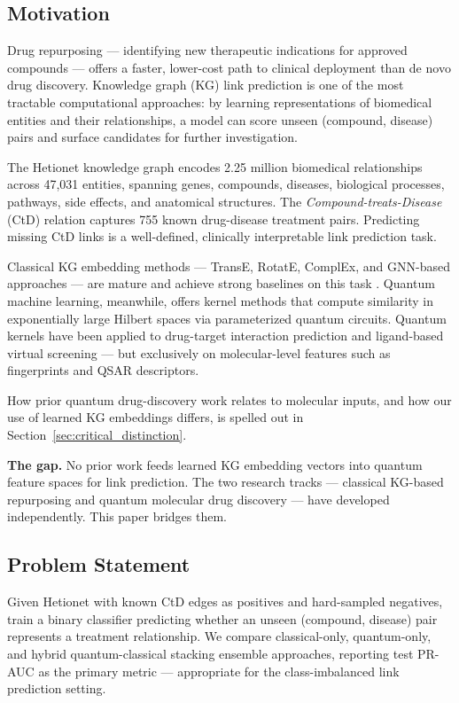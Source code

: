 \documentclass[10pt,twocolumn]{article}
\begin{document}
\subsection{Motivation}

Drug repurposing --- identifying new therapeutic indications for approved compounds --- offers a faster, lower-cost path to clinical deployment than de novo drug discovery. Knowledge graph (KG) link prediction is one of the most tractable computational approaches: by learning representations of biomedical entities and their relationships, a model can score unseen (compound, disease) pairs and surface candidates for further investigation.

The Hetionet knowledge graph \cite{himmelstein2017} encodes 2.25 million biomedical relationships across 47,031 entities, spanning genes, compounds, diseases, biological processes, pathways, side effects, and anatomical structures. The \textit{Compound-treats-Disease} (CtD) relation captures 755 known drug-disease treatment pairs. Predicting missing CtD links is a well-defined, clinically interpretable link prediction task.

Classical KG embedding methods --- TransE, RotatE, ComplEx, and GNN-based approaches --- are mature and achieve strong baselines on this task \cite{mayers2023}. Quantum machine learning, meanwhile, offers kernel methods that compute similarity in exponentially large Hilbert spaces via parameterized quantum circuits. Quantum kernels have been applied to drug-target interaction prediction \cite{qkdti2025} and ligand-based virtual screening \cite{kruger2023} --- but exclusively on molecular-level features such as fingerprints and QSAR descriptors.

How prior quantum drug-discovery work relates to molecular inputs, and how our
use of learned KG embeddings differs, is spelled out in
Section~\ref{sec:critical_distinction}.

\textbf{The gap.} No prior work feeds learned KG embedding vectors into quantum feature spaces for link prediction. The two research tracks --- classical KG-based repurposing and quantum molecular drug discovery --- have developed independently. This paper bridges them.

\subsection{Problem Statement}

Given Hetionet with known CtD edges as positives and hard-sampled negatives, train a binary classifier predicting whether an unseen (compound, disease) pair represents a treatment relationship. We compare classical-only, quantum-only, and hybrid quantum-classical stacking ensemble approaches, reporting test PR-AUC as the primary metric --- appropriate for the class-imbalanced link prediction setting.
\end{document}
